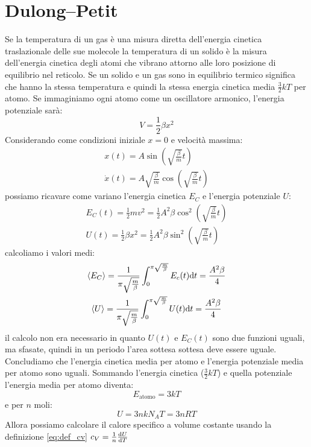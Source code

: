 \section{Dulong--Petit}
Se la temperatura di un gas è una misura diretta dell'energia cinetica traslazionale delle sue molecole la temperatura di un solido è la misura dell'energia cinetica degli atomi che vibrano attorno alle loro posizione di equilibrio nel reticolo. Se un solido e un gas sono in equilibrio termico significa che hanno la stessa temperatura e quindi la stessa energia cinetica media $\frac{3}{2}kT$ per atomo. Se immaginiamo ogni atomo come un oscillatore armonico, l'energia potenziale sarà:
\begin{equation}
	V=\frac{1}{2}\beta x^2
\end{equation}
Considerando come condizioni iniziale $x=0$ e velocità massima:
\begin{gather}
	x(t)=A\sin\left(\sqrt{\frac{\beta}{m}}t\right)\\
	\dot x(t)=A\sqrt{\frac{\beta}{m}}\cos\left(\sqrt{\frac{\beta}{m}}t\right)
\end{gather}
possiamo ricavare come variano l'energia cinetica $E_C$ e l'energia potenziale $U$:
\begin{gather}
	E_C(t)=\frac{1}{2}mv^2=\frac{1}{2}{A^2\beta}\cos^2\left(\sqrt{\frac{\beta}{m}}t\right)\\
	U(t)=\frac{1}{2}\beta x^2=\frac{1}{2}A^2 \beta\sin^2\left(\sqrt{\frac{\beta}{m}}t\right)
\end{gather}
calcoliamo i valori medi:
\begin{gather}
	\left<E_C\right>=\frac{1}{\pi\sqrt{\frac{m}{\beta}}}\int_0^{\pi\sqrt{\frac{m}{\beta}}} E_c(t)\mathrm{d} t=\frac{A^2\beta}{4}\\
	\left<U\right>=\frac{1}{\pi\sqrt{\frac{m}{\beta}}}\int_0^{\pi\sqrt{\frac{m}{\beta}}} U(t)\mathrm{d} t=\frac{A^2\beta}{4}
\end{gather}
il calcolo non era necessario in quanto $U(t)$ e $E_C(t)$ sono due funzioni uguali, ma sfasate, quindi in un periodo l'area sottesa sottesa deve essere uguale. Concludiamo che l'energia cinetica media per atomo e l'energia potenziale media per atomo sono uguali.
Sommando l'energia cinetica ($\frac{3}{2}kT$) e quella potenziale l'energia media per atomo diventa:
\begin{equation}
	E_\text{atomo}=3kT
\end{equation}
e per $n$ moli:
\begin{equation}
	U=3nkN_AT=3nRT
\end{equation}
Allora possiamo calcolare il calore specifico a volume costante usando la definizione \eqref{eq:def_cv} $c_V=\frac{1}{n}\frac{\mathrm{d} U}{\mathrm{d} T}$
